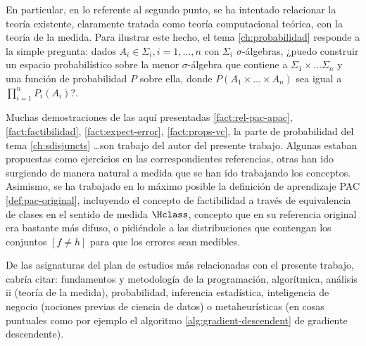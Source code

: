 En particular, en lo referente al segundo punto, se ha intentado relacionar la teoría existente, claramente tratada como 
teoría computacional teórica, con la teoría de la medida. Para ilustrar este hecho, el tema \ref{ch:probabilidad} responde a la 
simple pregunta: dados $A_i \in \Sigma_i, i=1, \ldots, n$ con $\Sigma_i$ $\sigma$-álgebras, ¿puedo construir un espacio probabilístico
sobre la menor $\sigma$-álgebra que contiene a $\Sigma_1 \times \ldots \Sigma_n$ y una función de probabilidad $P$ sobre ella,
donde $P(A_1 \times \ldots \times A_n)$ sea igual a $\prod_{i=1}^n P_i(A_i)$?. 

Muchas demostraciones de las aquí presentadas \ref{fact:rel-pac-apac}, \ref{fact:factibilidad}, \ref{fact:expect-error},
\ref{fact:props-vc}, la parte de probabilidad del tema \ref{ch:sdisjuncts} \ldots son trabajo del autor del presente trabajo. Algunas
estaban propuestas como ejercicios en las correspondientes referencias, otras han ido surgiendo de manera natural a medida que 
se han ido trabajando los conceptos. Asimismo, se ha trabajado en lo máximo posible la definición de aprendizaje PAC \ref{def:pac-original},
incluyendo el concepto de factibilidad a través de equivalencia de clases en el sentido de medida $\Hclass$, concepto que en su
referencia original era bastante más difuso, o pidiéndole a las distribuciones que contengan los conjuntos $[f\neq h]$ para
que los errores sean medibles.

De las asignaturas del plan de estudios más relacionadas con el presente trabajo, cabría citar: fundamentos y metodología
de la programación, algorítmica, análisis ii (teoría de la medida), probabilidad, inferencia estadística, inteligencia
de negocio (nociones previas de ciencia de datos) o metaheurísticas (en cosas puntuales como por ejemplo el algoritmo 
\ref{alg:gradient-descendent} de gradiente descendente).
